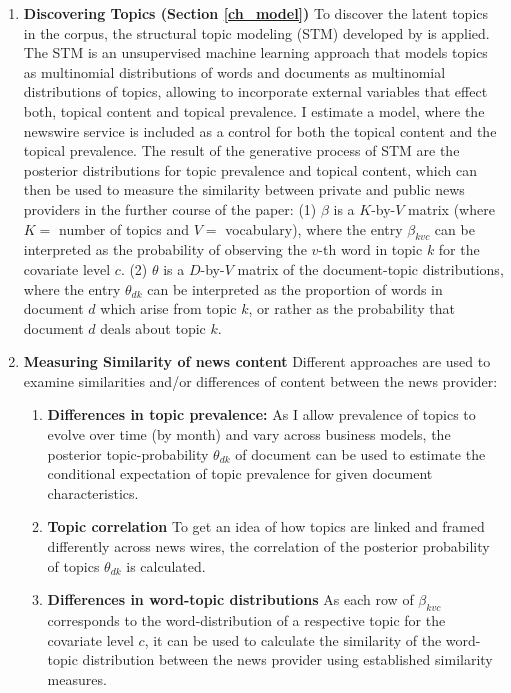 \documentclass[12pt,a4paper,notitlepage]{article}
\begin{document}
\begin{enumerate}
	\item \textbf{Discovering Topics (Section \ref{ch_model})} To discover the latent topics in the corpus, the structural topic modeling (STM) developed by \citet{roberts_model_2016} is applied. The STM is an unsupervised machine learning approach that models topics as multinomial distributions of words and documents as multinomial distributions of topics, allowing to incorporate external variables that effect both, topical content and topical prevalence. I estimate a model, where the newswire service is included as a control for both the topical content and the topical prevalence. The result of the generative process of STM are the posterior distributions for topic prevalence and topical content, which can then be used to measure the similarity between private and public news providers in the further course of the paper: (1) $\beta$ is a $K$-by-$V$ matrix (where $K=$ number of topics and $V=$ vocabulary), where the entry $\beta_{kvc}$ can be interpreted as the probability of observing the $v$-th word in topic $k$ for the covariate level $c$. (2) $\theta$ is a $D$-by-$V$ matrix of the document-topic distributions, where the entry $\theta_{dk}$ can be interpreted as the proportion of words in document $d$ which arise from topic $k$, or rather as the probability that document $d$ deals about topic $k$. 
	 
	\item \textbf{Measuring Similarity of news content} Different approaches are used to examine similarities and/or differences of content between the news provider:
	\begin{enumerate}
		\item\label{item_1}\textbf{Differences in topic prevalence:} As I allow prevalence of topics to evolve over time (by month) and vary across business models, the posterior topic-probability $\theta_{dk}$ of document can be used to estimate the conditional expectation of topic prevalence for given document characteristics. 
		
		\item\label{item_2} \textbf{Topic correlation} To get an idea of how topics are linked and framed differently across news wires, the correlation of the posterior probability of topics $\theta_{dk}$ is calculated.

		\item\label{item_3} \textbf{Differences in word-topic distributions} As each row of $\beta_{kvc}$ corresponds to the word-distribution of a respective topic for the covariate level $c$, it can be used to calculate the similarity of the word-topic distribution between the news provider using established similarity measures. 
		
		\end{enumerate}
	
\end{enumerate}
\end{document}
